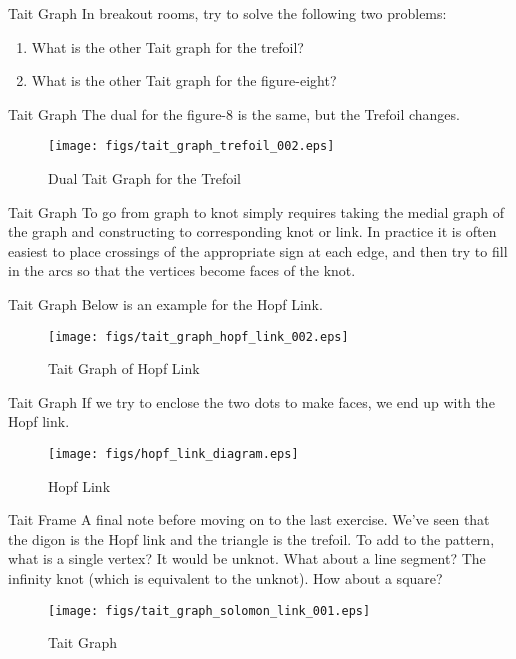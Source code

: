 \documentclass{beamer}
\begin{document}
    \begin{frame}{Tait Graph}
        In breakout rooms, try to solve the following two problems:
        \begin{enumerate}
            \item What is the other Tait graph for the trefoil?
            \item What is the other Tait graph for the figure-eight?
        \end{enumerate}
    \end{frame}
    \begin{frame}{Tait Graph}
        The dual for the figure-8 is the same, but the Trefoil changes.
        \begin{figure}
            \centering
            \texttt{[image: figs/tait\_graph\_trefoil\_002.eps]}
            \caption{Dual Tait Graph for the Trefoil}
            \label{fig:tait_graph_trefoil_002}
        \end{figure}
    \end{frame}
    \begin{frame}{Tait Graph}
        To go from graph to knot simply requires taking the
        medial graph of the graph and constructing to corresponding
        knot or link. In practice it is often easiest to place crossings
        of the appropriate sign at each edge, and then try to fill in the arcs
        so that the vertices become faces of the knot.
    \end{frame}
    \begin{frame}{Tait Graph}
        Below is an example for the Hopf Link.
        \begin{figure}
            \centering
            \texttt{[image: figs/tait\_graph\_hopf\_link\_002.eps]}
            \caption{Tait Graph of Hopf Link}
            \label{fig:tait_graph_hopf_link_002}
        \end{figure}
    \end{frame}
    \begin{frame}{Tait Graph}
        If we try to enclose the two dots to make faces, we end up with the Hopf link.
        \begin{figure}
            \centering
            \texttt{[image: figs/hopf\_link\_diagram.eps]}
            \caption{Hopf Link}
            \label{fig:hopf_link_diagram}
        \end{figure}
    \end{frame}
    \begin{frame}{Tait Frame}
        A final note before moving on to the last exercise. We've seen
        that the digon is the Hopf link and the triangle is the trefoil.
        To add to the pattern, what is a single vertex? It would be unknot.
        What about a line segment? The infinity knot (which is equivalent to the unknot).
        How about a square?
        \begin{figure}
            \centering
            \texttt{[image: figs/tait\_graph\_solomon\_link\_001.eps]}
            \caption{Tait Graph}
            \label{fig:tait_graph_solomon_link_001}
        \end{figure}
    \end{frame}
\end{document}
